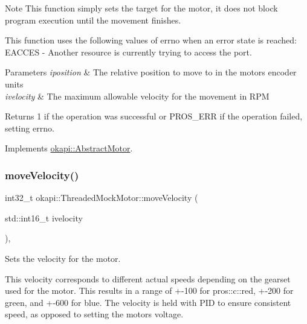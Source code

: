 \begin{DoxyNote}{Note}
This function simply sets the target for the motor, it does not block program execution until the movement finishes.
\end{DoxyNote}
This function uses the following values of errno when an error state is reached\+: E\+A\+C\+C\+ES -\/ Another resource is currently trying to access the port.


\begin{DoxyParams}{Parameters}
{\em iposition} & The relative position to move to in the motor\textquotesingle{}s encoder units \\
\hline
{\em ivelocity} & The maximum allowable velocity for the movement in R\+PM \\
\hline
\end{DoxyParams}
\begin{DoxyReturn}{Returns}
1 if the operation was successful or P\+R\+O\+S\+\_\+\+E\+RR if the operation failed, setting errno. 
\end{DoxyReturn}


Implements \mbox{\hyperlink{classokapi_1_1AbstractMotor_a5a65d70a30f536593326cb754700e240}{okapi\+::\+Abstract\+Motor}}.

\mbox{\label{classokapi_1_1ThreadedMockMotor_ac0df701e407cf12cd4d521eb519217b1}} 
\subsubsection{\texorpdfstring{moveVelocity()}{moveVelocity()}}
{\footnotesize\ttfamily int32\+\_\+t okapi\+::\+Threaded\+Mock\+Motor\+::move\+Velocity (\begin{DoxyParamCaption}\item[{std\+::int16\+\_\+t}]{ivelocity }\end{DoxyParamCaption})\hspace{0.3cm}{\ttfamily [override]}, {\ttfamily [virtual]}}



Sets the velocity for the motor. 

This velocity corresponds to different actual speeds depending on the gearset used for the motor. This results in a range of +-\/100 for pros\+::c\+::red, +-\/200 for green, and +-\/600 for blue. The velocity is held with P\+ID to ensure consistent speed, as opposed to setting the motor\textquotesingle{}s voltage.

